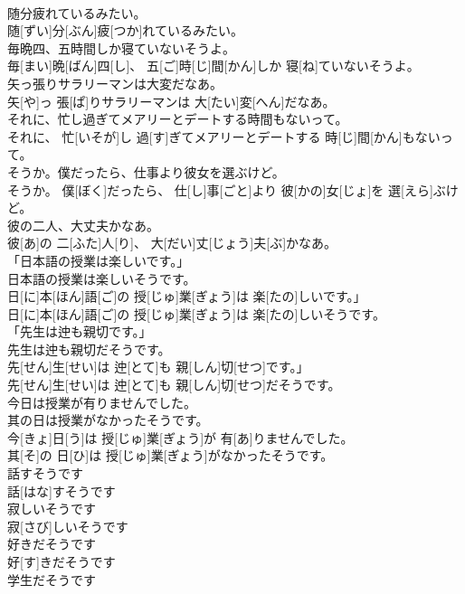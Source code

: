 \documentclass[8pt]{extreport}
\begin{document}
\begin{CJK}{UTF8}{min}
\\	随分疲れているみたい。	
\\	随[ずい]分[ぶん]疲[つか]れているみたい。
\\	毎晩四、五時間しか寝ていないそうよ。	
\\	毎[まい]晩[ばん]四[し]、 五[ご]時[じ]間[かん]しか 寝[ね]ていないそうよ。
\\	矢っ張りサラリーマンは大変だなあ。	
\\	矢[や]っ 張[ぱ]りサラリーマンは 大[たい]変[へん]だなあ。
\\	それに、忙し過ぎてメアリーとデートする時間もないって。	
\\	それに、 忙[いそが]し 過[す]ぎてメアリーとデートする 時[じ]間[かん]もないって。
\\	そうか。僕だったら、仕事より彼女を選ぶけど。	
\\	そうか。 僕[ぼく]だったら、 仕[し]事[ごと]より 彼[かの]女[じょ]を 選[えら]ぶけど。
\\	彼の二人、大丈夫かなあ。	
\\	彼[あ]の 二[ふた]人[り]、 大[だい]丈[じょう]夫[ぶ]かなあ。
\\	「日本語の授業は楽しいです。」 
\\	日本語の授業は楽しいそうです。	
\\	日[に]本[ほん]語[ご]の 授[じゅ]業[ぎょう]は 楽[たの]しいです。」 
\\	日[に]本[ほん]語[ご]の 授[じゅ]業[ぎょう]は 楽[たの]しいそうです。
\\	「先生は迚も親切です。」 
\\	先生は迚も親切だそうです。	
\\	先[せん]生[せい]は 迚[とて]も 親[しん]切[せつ]です。」 
\\	先[せん]生[せい]は 迚[とて]も 親[しん]切[せつ]だそうです。
\\	今日は授業が有りませんでした。 
\\	其の日は授業がなかったそうです。	
\\	今[きょ]日[う]は 授[じゅ]業[ぎょう]が 有[あ]りませんでした。 
\\	其[そ]の 日[ひ]は 授[じゅ]業[ぎょう]がなかったそうです。
\\	話すそうです	
\\	話[はな]すそうです
\\	寂しいそうです	
\\	寂[さび]しいそうです
\\	好きだそうです	
\\	好[す]きだそうです
\\	学生だそうです	

\end{CJK}
\end{document}

